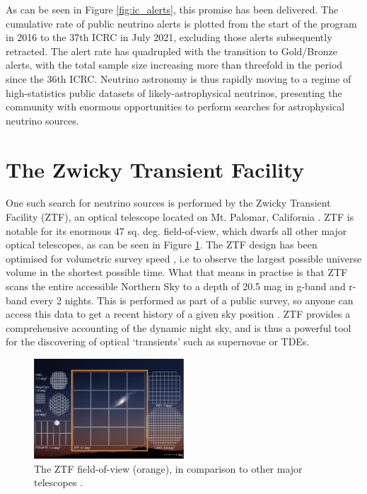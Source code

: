 \documentclass[a4paper,11pt]{article}
\begin{document}
As can be seen in Figure \ref{fig:ic_alerts}, this promise has been delivered. The cumulative rate of public neutrino alerts is plotted from the start of the program in 2016 to the 37th ICRC in July 2021, excluding those alerts subsequently retracted. The alert rate has quadrupled with the transition to Gold/Bronze alerts, with the total sample size increasing more than threefold in the period since the 36th ICRC. Neutrino astronomy is thus rapidly moving to a regime of high-statistics public datasets of likely-astrophysical neutrinos, presenting the community with enormous opportunities to perform searches for astrophysical neutrino sources. 

\section{The Zwicky Transient Facility}

One such search for neutrino sources is performed by the Zwicky Transient Facility (ZTF), an optical telescope located on Mt. Palomar, California \cite{ztf_19_science}. ZTF is notable for its enormous 47 sq. deg. field-of-view, which dwarfs all other major optical telescopes, as can be seen in Figure \ref{fig:ztf_fov}. The ZTF design has been optimised for volumetric survey speed \cite{ztf_system}, i.e to observe the largest possible universe volume in the shortest possible time. What that means in practise is that ZTF scans the entire accessible Northern Sky to a depth of 20.5 mag in g-band and r-band every 2 nights. This is performed as part of a public survey, so anyone can access this data to get a recent history of a given sky position \cite{ztf_survey_19}. ZTF provides a comprehensive accounting of the dynamic night sky, and is thus a powerful tool for the discovering of optical `transients' such as supernovae or TDEs.  

\begin{figure}[!ht]
	\centering \includegraphics[width=0.50\textwidth]{figures/ztf_fov}
	\caption{The ZTF field-of-view (orange), in comparison to other major telescopes \cite{laher_18}.}
	\label{fig:ztf_fov}
\end{figure}
\end{document}
